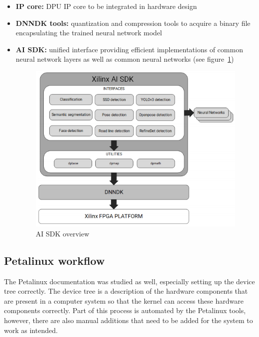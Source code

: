 \begin{itemize}
	\item \textbf{\ac{IP} core:} \ac{DPU} \ac{IP} core to be integrated in hardware design
	\item \textbf{\ac{DNNDK} tools:} quantization and compression tools to acquire a binary file encapsulating the trained neural network model
	\item \textbf{\ac{AI} \ac{SDK}:} unified interface providing efficient implementations of common neural network layers as well as common neural networks (see figure~\ref{fig:ai_sdk})
	\begin{figure}[!htb]
		\centering
			\includegraphics[width=\textwidth]{bilder/ai_sdk.png}
			\caption{\ac{AI} \ac{SDK} overview \cite{ai_sdk}}
			\label{fig:ai_sdk}
	\end{figure}
\end{itemize}
\subsection{Petalinux workflow}
The Petalinux documentation was studied as well, especially setting up the device tree correctly. The device tree is a description of the hardware components that are present in a computer system so that the kernel can access these hardware components correctly. Part of this process is automated by the Petalinux tools, however, there are also manual additions that need to be added for the system to work as intended.
